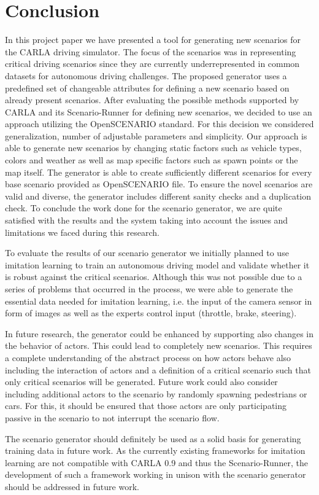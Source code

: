 \documentclass[conference, a4paper, 11pt]{IEEEtran}
\begin{document}
\section{Conclusion}
In this project paper we have presented a tool for generating new scenarios for the CARLA driving simulator. The focus of the scenarios was in representing critical driving scenarios since they are currently underrepresented in common datasets for autonomous driving challenges.
The proposed generator uses a predefined set of changeable attributes for defining a new scenario based on already present scenarios. After evaluating the possible methods supported by CARLA and its Scenario-Runner for defining new scenarios, we decided to use an approach utilizing the OpenSCENARIO standard. For this decision we considered generalization, number of adjustable parameters and simplicity. Our approach is able to generate new scenarios by changing static factors such as vehicle types, colors and weather as well as map specific factors such as spawn points or the map itself. The generator is able to create sufficiently different scenarios for every base scenario provided as OpenSCENARIO file. To ensure the novel scenarios are valid and diverse, the generator includes different sanity checks and a duplication check.
To conclude the work done for the scenario generator, we are quite satisfied with the results and the system taking into account the issues and limitations we faced during this research.

To evaluate the results of our scenario generator we initially planned to use imitation learning to train an autonomous driving model and validate whether it is robust against the critical scenarios. Although this was not possible due to a series of problems that occurred in the process, we were able to generate the essential data needed for imitation learning, i.e. the input of the camera sensor in form of images as well as the experts control input (throttle, brake, steering).

In future research, the generator could be enhanced by supporting also changes in the behavior of actors. This could lead to completely new scenarios. This requires a complete understanding of the abstract process on how actors behave also including the interaction of actors and a definition of a critical scenario such that only critical scenarios will be generated.
Future work could also consider including additional actors to the scenario by randomly spawning pedestrians or cars. For this, it should be ensured that those actors are only participating passive in the scenario to not interrupt the scenario flow.

The scenario generator should definitely be used as a solid basis for generating training data in future work. As the currently existing frameworks for imitation learning are not compatible with CARLA 0.9 and thus the Scenario-Runner, the development of such a framework working in unison with the scenario generator should be addressed in future work.

\printbibliography
\end{document}
